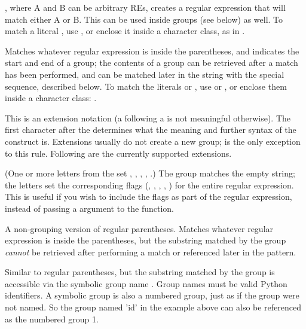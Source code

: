 \begin{list}{}{\leftmargin \MyLeftMargin {} \MyLabelWidth}
%
\item[\character{|}], where A and B can be arbitrary REs,
creates a regular expression that will match either A or B.  This can
be used inside groups (see below) as well.  To match a literal \character{|},
use \regexp{\e|}, or enclose it inside a character class, as in  \regexp{[|]}.
%
\item[\code{(...)}] Matches whatever regular expression is inside the
parentheses, and indicates the start and end of a group; the contents
of a group can be retrieved after a match has been performed, and can
be matched later in the string with the  special
sequence, described below.  To match the literals \character{(} or , 
use \regexp{\e(} or \regexp{\e)}, or enclose them inside a character
class: \regexp{[(] [)]}.
%
\item[\code{(?...)}] This is an extension notation (a  following a
\character{(} is not meaningful otherwise).  The first character after
the  
determines what the meaning and further syntax of the construct is.
Extensions usually do not create a new group;
 is the only exception to this rule.
Following are the currently supported extensions.
%
\item[\code{(?iLmsx)}] (One or more letters from the set ,
, , , .)  The group matches
the empty string; the letters set the corresponding flags
(, , , ,
) for the entire regular expression.  This is useful if
you wish to include the flags as part of the regular expression, instead
of passing a  argument to the  function. 
%
\item[\code{(?:...)}] A non-grouping version of regular parentheses.
Matches whatever regular expression is inside the parentheses, but the
substring matched by the 
group \emph{cannot} be retrieved after performing a match or
referenced later in the pattern. 
%
\item[\code{(?P<\var{name}>...)}] Similar to regular parentheses, but
the substring matched by the group is accessible via the symbolic group
name .  Group names must be valid Python identifiers.  A
symbolic group is also a numbered group, just as if the group were not
named.  So the group named 'id' in the example above can also be
referenced as the numbered group 1.


\end{list}
